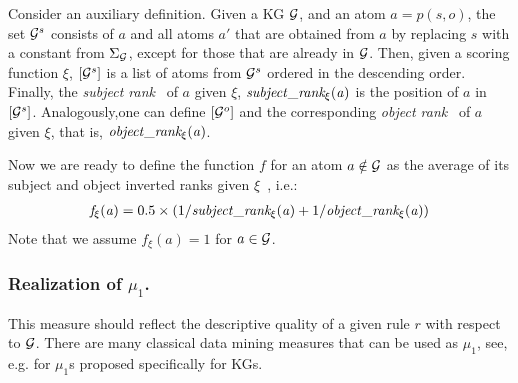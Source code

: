Consider an auxiliary definition. Given a KG $\mathcal{G}$, and an atom $a=p(s,o)$, the set $\mathcal{G}^s$ consists of $a$ and all atoms $a'$ that are obtained from $a$ by replacing $s$ with a constant from $\Sigma_\mathcal{G}$, except for those that are already in $\mathcal{G}$. 
Then, given a scoring function $\xi$, $[\mathcal{G}^s]$ is a list of atoms from $\mathcal{G}^s$ ordered in the descending order.
Finally, the \emph{subject rank}~\cite{DBLP:journals/corr/abs-1301-3485} of $a$ given $\xi$, $\mathit{subject\_rank_\xi(a)}$ is the position of $a$ in $[\mathcal{G}^s]$. 
Analogously,one can define $[\mathcal{G}^o]$ and the corresponding 
\emph{object rank}~\cite{DBLP:journals/corr/abs-1301-3485} of $a$ given $\xi$, that is, $\mathit{object\_rank_\xi(a)}$. 

Now we are ready to define the function $f$ for an atom $a \notin \mathcal{G}$
as the average of its subject and object inverted ranks given $\xi$~\cite{DBLP:journals/corr/abs-1301-3485}, i.e.:
\begin{align*}
\mathit{f_\xi(a)} = 0.5\times(1/\mathit{subject\_rank_\xi(a)}+ 1/\mathit{object\_rank_\xi(a)})
\end{align*}
Note that we assume $f_{\xi}(a) = 1$ for $a \in \mathcal{G}$.

\subsubsection{Realization of $\mu_1$.}
This measure should reflect the descriptive quality of a given rule $r$ with respect to $\mathcal{G}$.
There are many  classical data mining measures that can be used as $\mu_1$, see, e.g. \cite{DBLP:conf/eurogp/MinhdNT18,amie,carl,measureskg} for $\mu_1$s proposed specifically for KGs.


